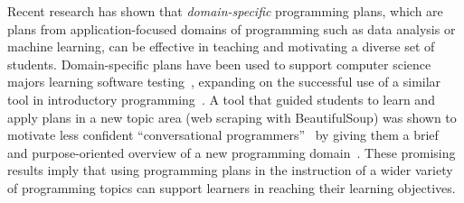 Recent research has shown that \textit{domain-specific} programming plans, which are plans from application-focused domains of programming such as data analysis or machine learning, can be effective in teaching and motivating a diverse set of students. Domain-specific plans have been used to support computer science majors learning software testing~\cite{LojoFox_TestingPlan_ITiCSE-2022}, expanding on the successful use of a similar tool in introductory programming~\cite{Weinman_Fox_Faded_Parsons}. 
A tool that guided students to learn and apply plans in a new topic area (web scraping with BeautifulSoup) was shown to motivate less confident ``conversational programmers''~\cite{Chilana_RiseConversationalProgrammer_VLHCC-2015} by giving them a brief and purpose-oriented overview of a new programming domain~\cite{Cunningham_PurposeFirstProgramming_CHI-2021}. 
These promising results imply that using programming plans in the instruction of a wider variety of programming topics can support learners in reaching their learning objectives. 



